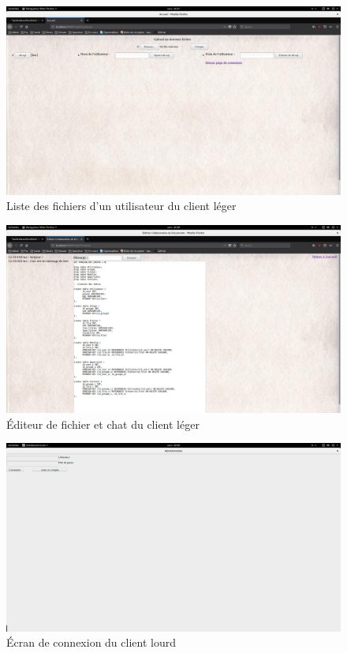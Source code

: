 \documentclass[a4paper, 12pt]{article}
\begin{document}
\begin{figure}[H]
  \begin{center}
    \includegraphics[scale=0.2]{fichier_leger.png}
  \end{center}
  \caption{Liste des fichiers d'un utilisateur du client léger}
\end{figure}

\begin{figure}[H]
  \begin{center}
    \includegraphics[scale=0.2]{editeur_leger}
  \end{center}
  \caption{Éditeur de fichier et chat du client léger}
\end{figure}

\begin{figure}[H]
  \begin{center}
    \includegraphics[scale=0.2]{client_lourd.png}
  \end{center}
  \caption{Écran de connexion du client lourd}
\end{figure}
\end{document}
